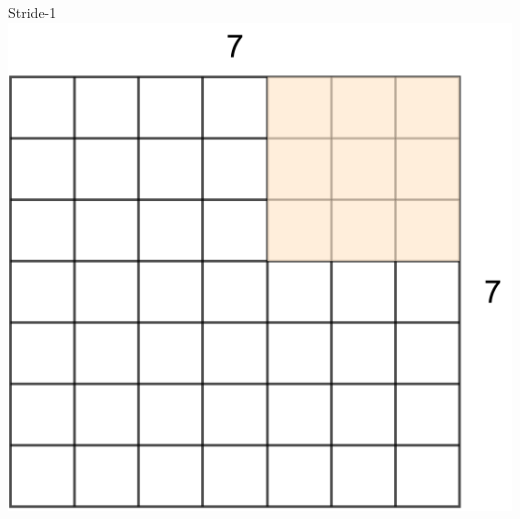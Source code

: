 \documentclass[default, aspectratio=169]{beamer}
\begin{document}
\begin{frame}{Stride-1}
		\includegraphics[keepaspectratio, scale=0.13]{pic/Stride5.png}
		
	\end{frame}
	
	
	
	
	
\end{document}
